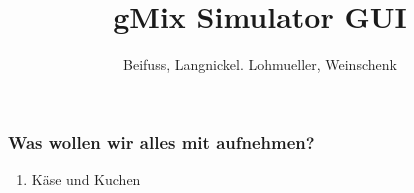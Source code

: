 \documentclass[]{beamer}
\title{gMix Simulator GUI}
\author{Beifuss, Langnickel. Lohmueller, Weinschenk}
\begin{document}
    \frame{\titlepage}
    \frame{\tableofcontents}

\begin{frame}[t]\frametitle{Was wollen wir alles mit aufnehmen?}
    \begin{enumerate}
        \item Käse und Kuchen
    \end{enumerate}
\end{frame}
\end{document}
